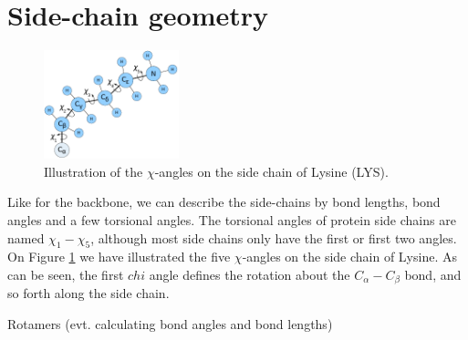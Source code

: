 
\section{Side-chain geometry}

\begin{figure}
	\centering
	\includegraphics[width=0.35\textwidth]{figures/lysine}
    \caption{Illustration of the $\chi$-angles on the side chain of Lysine (LYS).}
    \label{fig:lysine-and-chi}
\end{figure}

Like for the backbone, we can describe the side-chains by bond
lengths, bond angles and a few torsional angles. The torsional angles
of protein side chains are named $\chi_1-\chi_5$, although most side
chains only have the first or first two angles. On Figure
\ref{fig:lysine-and-chi} we have illustrated the five $\chi$-angles on
the side chain of Lysine. As can be seen, the first $chi$ angle
defines the rotation about the $C_\alpha-C_\beta$ bond, and so forth
along the side chain.

Rotamers (evt. calculating bond angles and bond lengths)
